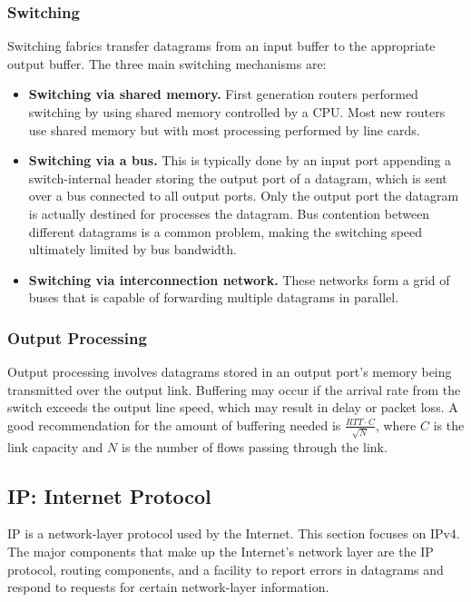 \documentclass[12pt,titlepage]{article}
\begin{document}
      \subsubsection{Switching}
        Switching fabrics transfer datagrams from an input buffer to the appropriate output buffer. The three main switching mechanisms are:
        \begin{itemize}
          \item \textbf{Switching via shared memory.} First generation routers performed switching by using shared memory controlled by a CPU. Most new routers
            use shared memory but with most processing performed by line cards.
          \item \textbf{Switching via a bus.} This is typically done by an input port appending a switch-internal header storing the output port of a datagram,
            which is sent over a bus connected to all output ports. Only the output port the datagram is actually destined for processes the datagram. Bus
            contention between different datagrams is a common problem, making the switching speed ultimately limited by bus bandwidth.
          \item \textbf{Switching via interconnection network.} These networks form a grid of buses that is capable of forwarding multiple datagrams in parallel.
        \end{itemize}

      \subsubsection{Output Processing}
        Output processing involves datagrams stored in an output port's memory being transmitted over the output link. Buffering may occur if the arrival rate
        from the switch exceeds the output line speed, which may result in delay or packet loss. A good recommendation for the amount of buffering needed is
        $\frac{RTT \cdot C}{\sqrt{N}}$, where $C$ is the link capacity and $N$ is the number of flows passing through the link.

    \subsection{IP: Internet Protocol}
      IP is a network-layer protocol used by the Internet. This section focuses on IPv4. The major components that make up the Internet's network layer are
      the IP protocol, routing components, and a facility to report errors in datagrams and respond to requests for certain network-layer information.
\end{document}
